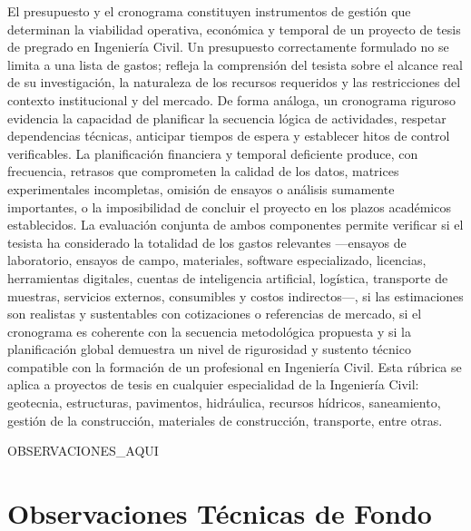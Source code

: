 \documentclass[12pt,a4paper]{report}
\begin{document}
El presupuesto y el cronograma constituyen instrumentos de gestión que determinan la viabilidad operativa, económica y temporal de un proyecto de tesis de pregrado en Ingeniería Civil. Un presupuesto correctamente formulado no se limita a una lista de gastos; refleja la comprensión del tesista sobre el alcance real de su investigación, la naturaleza de los recursos requeridos y las restricciones del contexto institucional y del mercado. De forma análoga, un cronograma riguroso evidencia la capacidad de planificar la secuencia lógica de actividades, respetar dependencias técnicas, anticipar tiempos de espera y establecer hitos de control verificables. La planificación financiera y temporal deficiente produce, con frecuencia, retrasos que comprometen la calidad de los datos, matrices experimentales incompletas, omisión de ensayos o análisis sumamente importantes, o la imposibilidad de concluir el proyecto en los plazos académicos establecidos. La evaluación conjunta de ambos componentes permite verificar si el tesista ha considerado la totalidad de los gastos relevantes ---ensayos de laboratorio, ensayos de campo, materiales, software especializado, licencias, herramientas digitales, cuentas de inteligencia artificial, logística, transporte de muestras, servicios externos, consumibles y costos indirectos---, si las estimaciones son realistas y sustentables con cotizaciones o referencias de mercado, si el cronograma es coherente con la secuencia metodológica propuesta y si la planificación global demuestra un nivel de rigurosidad y sustento técnico compatible con la formación de un profesional en Ingeniería Civil. Esta rúbrica se aplica a proyectos de tesis en cualquier especialidad de la Ingeniería Civil: geotecnia, estructuras, pavimentos, hidráulica, recursos hídricos, saneamiento, gestión de la construcción, materiales de construcción, transporte, entre otras.


{{OBSERVACIONES_AQUI}}


\section{Observaciones Técnicas de Fondo}
\end{document}
